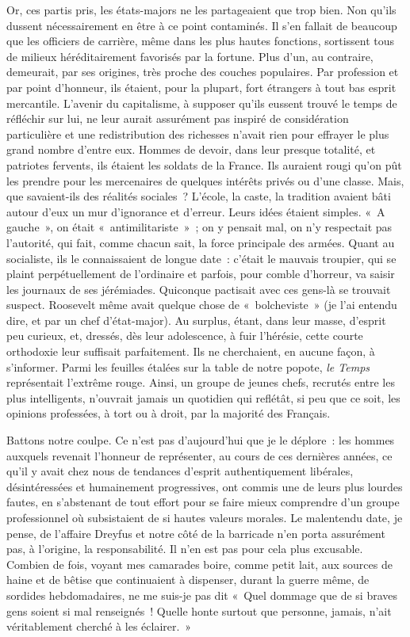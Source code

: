 \documentclass[french,twoside]{book} %
\begin{document}
Or, ces partis pris, les états-majors ne les partageaient que trop bien. Non qu’ils dussent nécessairement en être à ce point contaminés. Il s’en fallait de beaucoup que les officiers de carrière, même dans   les plus hautes fonctions, sortissent tous de milieux héréditairement favorisés par la fortune. Plus d’un, au contraire, demeurait, par ses origines, très proche des couches populaires. Par profession et par point d’honneur, ils étaient, pour la plupart, fort étrangers à tout bas esprit mercantile. L’avenir du capitalisme, à supposer qu’ils eussent trouvé le temps de réfléchir sur lui, ne leur aurait assurément pas inspiré de considération particulière et une redistribution des richesses n’avait rien pour effrayer le plus grand nombre d’entre eux. Hommes de devoir, dans leur presque totalité, et patriotes fervents, ils étaient les soldats de la France. Ils auraient rougi qu’on pût les prendre pour les mercenaires de quelques intérêts privés ou d’une classe. Mais, que savaient-ils des réalités sociales ? L’école, la caste, la tradition avaient bâti autour d’eux un mur d’ignorance et d’erreur. Leurs idées étaient simples. « A gauche », on était « antimilitariste » ; on y pensait mal, on n’y respectait pas l’autorité, qui fait, comme chacun sait, la force principale des armées. Quant au socialiste, ils le connaissaient de longue date : c’était le mauvais troupier, qui se plaint perpétuellement de l’ordinaire et parfois, pour comble d’horreur, va saisir les journaux de ses jérémiades. Quiconque pactisait avec ces gens-là se trouvait suspect. Roosevelt même avait quelque chose de « bolcheviste » (je l’ai entendu dire, et par un chef d’état-major). Au surplus, étant, dans leur masse, d’esprit peu curieux, et, dressés, dès leur adolescence, à fuir l’hérésie, cette courte orthodoxie leur suffisait parfaitement. Ils ne cherchaient, en aucune façon, à s’informer. Parmi les feuilles étalées sur la table de notre popote, {\itshape le Temps} représentait l’extrême rouge. Ainsi, un groupe de jeunes chefs, recrutés entre les plus intelligents, n’ouvrait jamais un quotidien qui reflétât, si peu que ce soit, les opinions professées, à tort ou à droit, par la majorité des Français.\par
  Battons notre coulpe. Ce n’est pas d’aujourd’hui que je le déplore : les hommes auxquels revenait l’honneur de représenter, au cours de ces dernières années, ce qu’il y avait chez nous de tendances d’esprit authentiquement libérales, désintéressées et humainement progressives, ont commis une de leurs plus lourdes fautes, en s’abstenant de tout effort pour se faire mieux comprendre d’un groupe professionnel où subsistaient de si hautes valeurs morales. Le malentendu date, je pense, de l’affaire Dreyfus et notre côté de la barricade n’en porta assurément pas, à l’origine, la responsabilité. Il n’en est pas pour cela plus excusable. Combien de fois, voyant mes camarades boire, comme petit lait, aux sources de haine et de bêtise que continuaient à dispenser, durant la guerre même, de sordides hebdomadaires, ne me suis-je pas dit « Quel dommage que de si braves gens soient si mal renseignés ! Quelle honte surtout que personne, jamais, n’ait véritablement cherché à les éclairer. »\par
\end{document}
